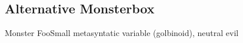 \documentclass[10pt,twoside]{article}
\begin{document}
\begin{multicols}{2}
\newpage
\subsection{Alternative Monsterbox}
\begin{monster}{Monster Foo}{Small metasyntatic variable (golbinoid), neutral evil}
	\basics[%
	armorclass = 12,
	hitpoints  = 16 (3d8 + 3),
	speed      = 50 ft
	]
	\hline
	\stats[
	STR = 12 (+1),
	DEX = 14 (+2)
	]
	\hline
	\details[%
	languages = {Common Lisp, Erlang},
	]
	\hline
	\begin{monsteraction}
		\lipsum[1]
	\end{monsteraction}
\end{monster}
\lipsum
    
\end{multicols}
\end{document}
